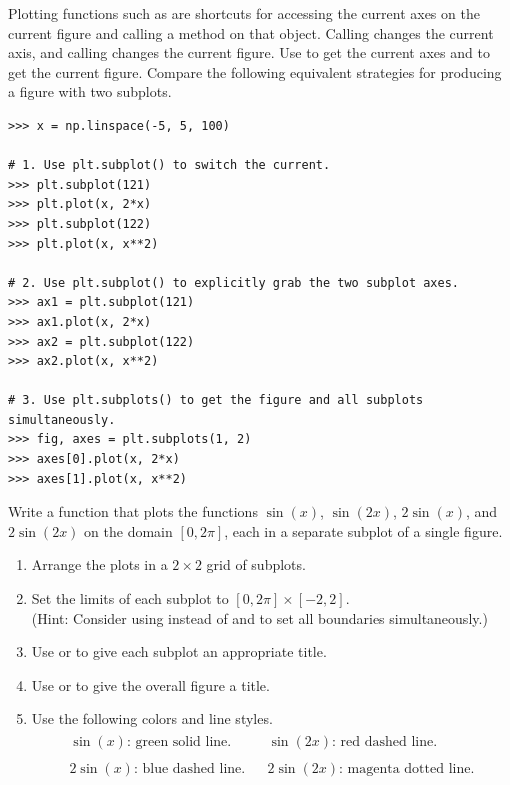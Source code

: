 \begin{info}
Plotting functions such as  are shortcuts for accessing the current axes on the current figure and calling a method on that  object.
Calling  changes the current axis, and calling  changes the current figure.
Use  to get the current axes and  to get the current figure.
Compare the following equivalent strategies for producing a figure with two subplots.

\begin{lstlisting}
>>> x = np.linspace(-5, 5, 100)

# 1. Use plt.subplot() to switch the current.
>>> plt.subplot(121)
>>> plt.plot(x, 2*x)
>>> plt.subplot(122)
>>> plt.plot(x, x**2)

# 2. Use plt.subplot() to explicitly grab the two subplot axes.
>>> ax1 = plt.subplot(121)
>>> ax1.plot(x, 2*x)
>>> ax2 = plt.subplot(122)
>>> ax2.plot(x, x**2)

# 3. Use plt.subplots() to get the figure and all subplots simultaneously.
>>> fig, axes = plt.subplots(1, 2)
>>> axes[0].plot(x, 2*x)
>>> axes[1].plot(x, x**2)
\end{lstlisting}

\end{info}

\begin{problem} %
Write a function that plots the functions $\sin(x)$, $\sin(2x)$, $2\sin(x)$, and $2\sin(2x)$ on the domain $[0, 2\pi]$, each in a separate subplot of a single figure.
\begin{enumerate}
    \item Arrange the plots in a $2\times 2$ grid of subplots.
    \item Set the limits of each subplot to $[0, 2\pi]\times[-2,2]$.
    \\(Hint: Consider using  instead of  and  to set all boundaries simultaneously.)
    \item Use  or  to give each subplot an appropriate title.
    \item Use  or  to give the overall figure a title.
    \item Use the following colors and line styles.
    \begin{align*}\begin{array}{lcl}
    \sin(x)\text{: green solid line.} && \sin(2x)\text{: red dashed line.}\\ \\
    2\sin(x)\text{: blue dashed line.} && 2\sin(2x)\text{: magenta dotted line.}
    \end{array}\end{align*}
\end{enumerate}
\end{problem}

